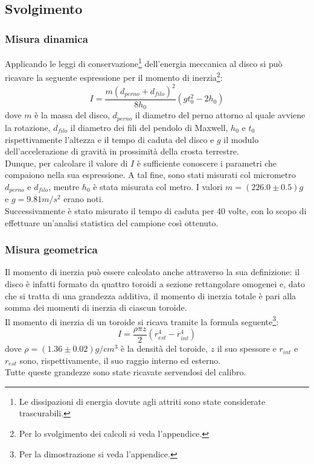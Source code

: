 \documentclass{article}
\begin{document}
\subsection{Svolgimento}
\subsubsection{Misura dinamica}
\label{svolgimento:dinamica}
Applicando le leggi di conservazione\footnote{Le dissipazioni di energia dovute agli attriti sono state considerate trascurabili.} dell'energia meccanica al disco si può ricavare la seguente espressione per il momento di inerzia\footnote{Per lo svolgimento dei calcoli si veda l'appendice.}:
$$ I = \dfrac{m ( d_{perno} + d_{filo} )^2}{8 h_0} ( g t_0^2 - 2 h_0 ) $$
dove $ m $ è la massa del disco, $ d_{perno} $ il diametro del perno attorno al quale avviene la rotazione, $ d_{filo} $ il diametro dei fili del pendolo di Maxwell, $ h_0 $ e $ t_0 $ rispettivamente l'altezza e il tempo di caduta del disco e $ g $ il modulo dell'accelerazione di gravità in prossimità della crosta terrestre.\\
Dunque, per calcolare il valore di $ I $ è sufficiente conoscere i parametri che compaiono nella sua espressione. A tal fine, sono stati misurati col micrometro $ d_{perno} $ e $ d_{filo} $, mentre $ h_0 $ è stata misurata col metro. I valori $ m = ( 226.0 \pm 0.5 ) g $ e $ g = 9.81 m / s^2 $ erano noti.\\
Successivamente è stato misurato il tempo di caduta per 40 volte, con lo scopo di effettuare un'analisi statistica del campione così ottenuto.
\subsubsection{Misura geometrica}
Il momento di inerzia può essere calcolato anche attraverso la sua definizione: il disco è infatti formato da quattro toroidi a sezione rettangolare omogenei e, dato che si tratta di una grandezza additiva, il momento di inerzia totale è pari alla somma dei momenti di inerzia di ciascun toroide.\\
Il momento di inerzia di un toroide si ricava tramite la formula seguente\footnote{Per la dimostrazione si veda l'appendice.}:
$$ I = \dfrac{\rho \pi z}{2} ( r_{est}^4 - r_{int}^4 ) $$
dove $\rho=(1.36 \pm 0.02)g/cm^3$ è la densità del toroide, $ z $ il suo spessore e $ r_{int} $ e $ r_{est} $ sono, rispettivamente, il suo raggio interno ed esterno.\\
Tutte queste grandezze sono state ricavate servendosi del calibro.
\end{document}
